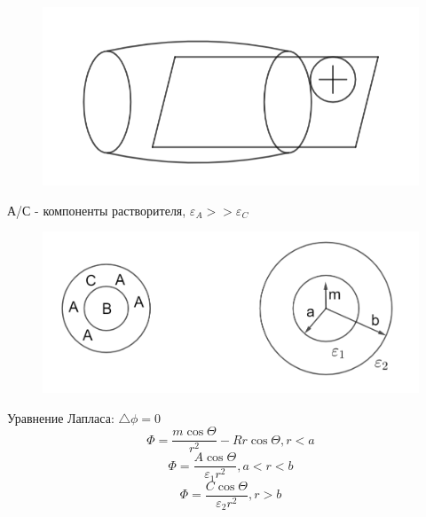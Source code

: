 \begin{lecture}
\begin{lecSection}[Кавитанты]
\begin{figure}[H]
\begin{minipage}[h]{0.49\linewidth}
	\end{minipage}
	\hfill
	\begin{minipage}[h]{0.49\linewidth}
		\centering\includegraphics[width=\linewidth]{lecture_09/pic5}
	\end{minipage}
	
\end{figure}
	
\end{lecSection}

\begin{lecSection}
	
А/С - компоненты растворителя, $\varepsilon_A >> \varepsilon_C$

		\begin{figure}[H]
	
	\centering\includegraphics[width=\linewidth]{lecture_09/pic6}
	
\end{figure}	

Уравнение Лапласа: $\bigtriangleup \phi = 0$
$$\Phi = \dfrac{m \cos \Theta}{r^2} - Rr \cos \Theta, r < a$$
$$\Phi = \dfrac{A\cos \Theta}{\varepsilon_1 r^2}, a < r < b$$
$$\Phi = \dfrac{C\cos \Theta}{\varepsilon_2 r^2}, r > b$$


\end{lecSection}
\end{lecture}
